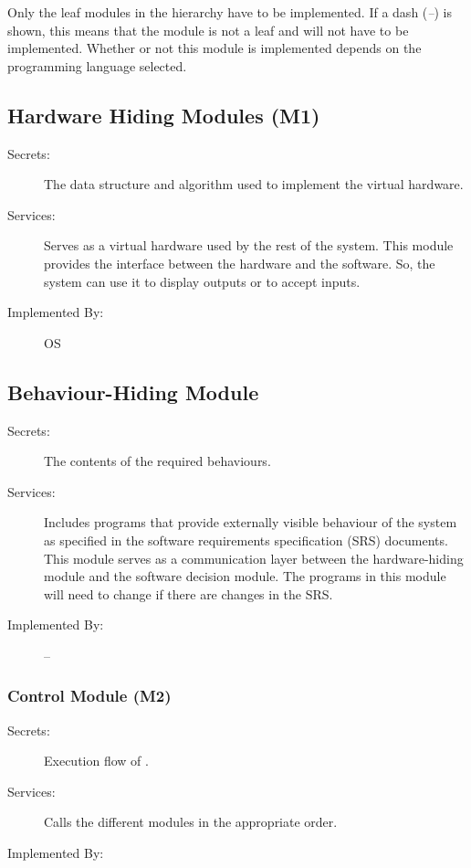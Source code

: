 \documentclass[12pt, titlepage]{article}
\newcommand{\mref}[1]{M\ref{#1}}
\begin{document}
Only the leaf modules in the
hierarchy have to be implemented. If a dash (\emph{--}) is shown, this means
that the module is not a leaf and will not have to be implemented. Whether or
not this module is implemented depends on the programming language
selected.

\subsection{Hardware Hiding Modules (M1)}%

\begin{description}
\item[Secrets:]The data structure and algorithm used to implement the virtual
  hardware.
\item[Services:]Serves as a virtual hardware used by the rest of the
  system. This module provides the interface between the hardware and the
  software. So, the system can use it to display outputs or to accept inputs.
\item[Implemented By:] OS
\end{description}

\subsection{Behaviour-Hiding Module}

\begin{description}
\item[Secrets:]The contents of the required behaviours.
\item[Services:]Includes programs that provide externally visible behaviour of
  the system as specified in the software requirements specification (SRS)
  documents. This module serves as a communication layer between the
  hardware-hiding module and the software decision module. The programs in this
  module will need to change if there are changes in the SRS.
\item[Implemented By:] --
\end{description}

\subsubsection{\progname{}Control Module (M2)}
\label{MG_Control}
\begin{description}
\item[Secrets:] Execution flow of \progname{}.  
\item[Services:] Calls the different modules in the appropriate order.
\item[Implemented By:] \progname{}
\end{description}
\end{document}
